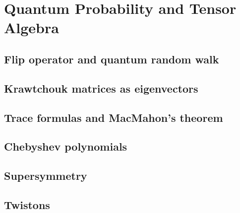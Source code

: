 \chapter{Quantum Probability and Tensor Algebra}
\label{ch:9}
\section{Flip operator and quantum random walk}
\label{sec:9-1}

\section{Krawtchouk matrices as eigenvectors}
\label{sec:9-2}

\section{Trace formulas and MacMahon's theorem}
\label{sec:9-3}

\section{Chebyshev polynomials}
\label{sec:9-4}

\section{Supersymmetry}
\label{sec:9-5}

\section{Twistons}
\label{sec:9-6}


